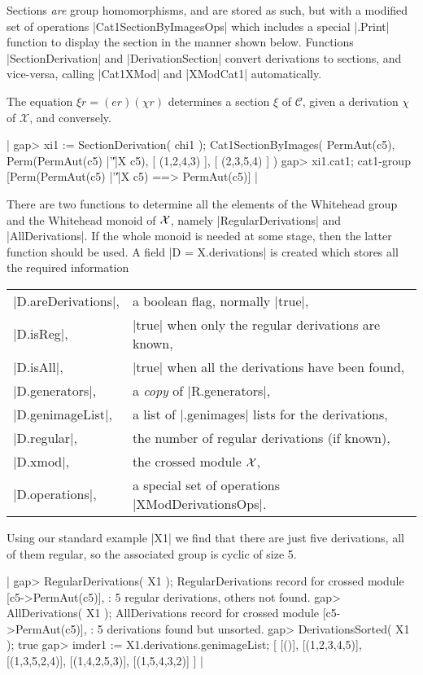Sections \emph{are} group  homomorphisms, and are  stored as such, but
with  a  modified  set  of  operations |Cat1SectionByImagesOps|  which
includes  a special |.Print|  function  to display  the section in the
manner   shown    below.    Functions    |SectionDerivation|       and
|DerivationSection|  convert  derivations to sections, and vice-versa,
calling |Cat1XMod| and |XModCat1| automatically.

The equation $\xi  r  = (er)(\chi  r)$ determines a  section  $\xi$ of
$\mathcal{C}$,   given   a  derivation $\chi$    of $\mathcal{X}$, and
conversely.

|    gap> xi1 := SectionDerivation( chi1 );
    Cat1SectionByImages( PermAut(c5), Perm(PermAut(c5) |'\|'|X c5),
        [ (1,2,4,3) ], [ (2,3,5,4) ] )
    gap> xi1.cat1;
    cat1-group [Perm(PermAut(c5) |'\|'|X c5) ==> PermAut(c5)]  |

There are two functions to determine all the elements of the Whitehead
group   and  the   Whitehead      monoid   of ${\cal   X}$,     namely
|RegularDerivations|  and |AllDerivations|.   If the  whole  monoid is
needed at some  stage,  then the  latter function should  be  used.  A
field  |D = X.derivations|  is created which   stores all the required
information\:

\begin{tabular}{ll}
|D.areDerivations|,  & a boolean flag, normally |true|,                    \\
|D.isReg|,           & |true| when only the regular derivations are known, \\
|D.isAll|,           & |true| when all the derivations have been found,    \\
|D.generators|,      & a \emph{copy} of |R.generators|,                    \\
|D.genimageList|,    & a list of |.genimages| lists for the derivations,   \\
|D.regular|,         & the number of regular derivations (if known),       \\
|D.xmod|,            & the crossed module ${\cal X}$,                      \\
|D.operations|,      & a special set of operations |XModDerivationsOps|.
\end{tabular}

Using  our  standard example |X1| we   find that there   are just five
derivations, all of them regular, so the associated group is cyclic of
size 5.

|    gap> RegularDerivations( X1 );
    RegularDerivations record for crossed module [c5->PermAut(c5)],
    : 5 regular derivations, others not found.
    gap> AllDerivations( X1 );
    AllDerivations record for crossed module [c5->PermAut(c5)],
    : 5 derivations found but unsorted.
    gap> DerivationsSorted( X1 );
    true
    gap> imder1 := X1.derivations.genimageList;
    [ [()], [(1,2,3,4,5)], [(1,3,5,2,4)], [(1,4,2,5,3)], [(1,5,4,3,2)] ] |

